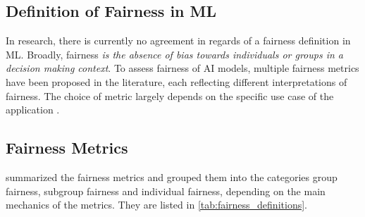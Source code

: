 \documentclass[12pt, a4paper, oneside]{book}   	%
\begin{document}
		
		\subsection{Definition of Fairness in \gls{ML}}
		
		In research, there is currently no agreement in regards of a fairness definition in \gls{ML}. Broadly, fairness \textit{is the absence of bias towards individuals or groups in a decision making context}. To assess fairness of \gls{AI} models, multiple fairness metrics have been proposed in the literature, each reflecting different interpretations of fairness. The choice of metric largely depends on the specific use case of the application \autocite{Mehrabi_2021}.
		
		\subsection{Fairness Metrics}
		
			\textcite{Mehrabi_2021} summarized the fairness metrics and grouped them into the categories group fairness, subgroup fairness and individual fairness, depending on the main mechanics of the metrics. They are listed in \autoref{tab:fairness_definitions}.
		
\end{document}
